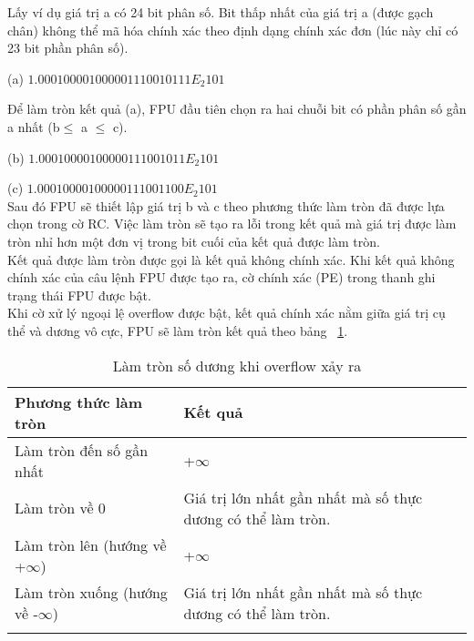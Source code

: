 	Lấy ví dụ giá trị a có 24 bit phân số. Bit thấp nhất của giá trị a (được gạch chân) không thể mã hóa chính xác theo định dạng chính xác đơn (lúc này chỉ có 23 bit phần phân số).
	
		(a)	$1.0001 0000 1000 0011 1001 0111E_{2} 101$
		
		Để làm tròn kết quả (a), FPU đầu tiên chọn ra hai chuỗi bit có phần phân số gần a nhất (b$\mathbb{\le}$ a $\mathbb{\le}$ c).
		
		(b) $1.0001 0000 1000 0011 1001 011E_{2} 101$
		
		(c)  $1.0001 0000 1000 0011 1001 100E_{2} 101$\\
				
		Sau đó FPU sẽ thiết lập giá trị b và c theo phương thức làm tròn đã được lựa chọn trong cờ RC. Việc làm tròn sẽ tạo ra lỗi trong kết quả mà giá trị được làm tròn nhỉ hơn một đơn vị trong bit cuối của kết quả được làm tròn.\\
		
	Kết quả được làm tròn được gọi là kết quả không chính xác. Khi kết quả không chính xác của câu lệnh FPU được tạo ra, cờ chính xác (PE) trong thanh ghi trạng thái FPU được bật.\\	
	
	Khi cờ xử lý ngoại lệ overflow được bật, kết quả chính xác nằm giữa giá trị cụ thể  và dương vô cực, FPU sẽ làm tròn kết quả theo bảng ~\ref{tb:RCOverflow}.
		\begin{longtable} {|m{6cm}|m{6cm}|}
			\hline
				Phương thức làm tròn & Kết quả \\			
			\hline						
			\hline
				Làm tròn đến số gần nhất & +$\mathbf{\infty}$\\
			\hline
				Làm tròn về 0 & Giá trị lớn nhất gần nhất mà số thực dương có thể làm tròn.\\
			\hline
				Làm tròn lên (hướng về +$\mathbf{\infty}$) &  +$\mathbf{\infty}$\\
			\hline
				Làm tròn xuống (hướng về -$\mathbf{\infty}$) & Giá trị lớn nhất gần nhất mà số thực dương có thể làm tròn.\\		
			\hline
			\caption{Làm tròn số dương khi overflow xảy ra}
			\label{tb:RCOverflow}
		\end{longtable}

